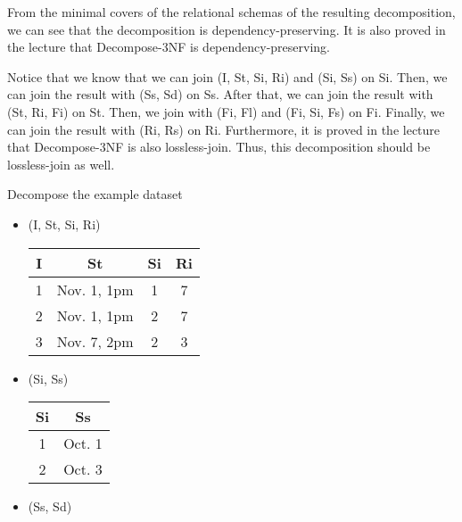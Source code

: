 \documentclass[12pt]{article}
\begin{document}
\begin{enumerate}
        From the minimal covers of the relational schemas of the resulting
        decomposition, we can see that the decomposition is
        dependency-preserving. It is also proved in the lecture that
        Decompose-3NF is dependency-preserving.

        Notice that we know that we can join (I, St, Si, Ri) and (Si, Ss) on Si.
        Then, we can join the result with (Ss, Sd) on Ss. After that, we can
        join the result with (St, Ri, Fi) on St. Then, we join with (Fi, Fl) and
        (Fi, Si, Fs) on Fi. Finally, we can join the result with (Ri, Rs) on Ri.
        Furthermore, it is proved in the lecture that Decompose-3NF is also
        lossless-join. Thus, this decomposition should be lossless-join as well.

        Decompose the example dataset
        \begin{itemize}
          \item (I, St, Si, Ri)
                \begin{center}
                  \begin{tabular}{ c c c c }
                    \hline
                    I & St           & Si & Ri \\
                    \hline
                    1 & Nov. 1, 1pm  & 1  & 7  \\
                    2 & Nov. 1, 1pm  & 2  & 7  \\
                    3 & Nov. 7, 2pm  & 2  & 3  \\
                    \hline
                  \end{tabular}
                \end{center}
          \item (Si, Ss)
                \begin{center}
                  \begin{tabular}{c c}
                    \hline
                    Si & Ss \\
                    \hline
                    1  & Oct. 1 \\
                    2  & Oct. 3 \\
                    \hline
                  \end{tabular}
                \end{center}
          \item (Ss, Sd)
                \begin{center}
                  \begin{tabular}{c c}
                    \hline

\end{tabular}
\end{center}
\end{itemize}
\end{enumerate}
\end{document}
